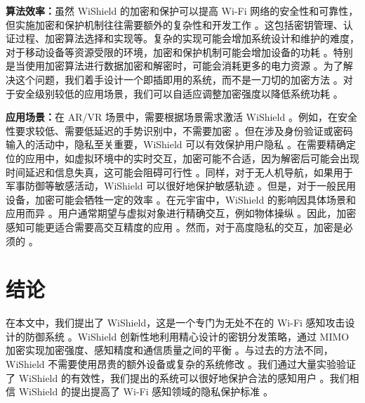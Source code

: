 \documentclass[journal]{IEEEtran}
\begin{document}
\textbf{算法效率：}虽然 WiShield 的加密和保护可以提高 Wi-Fi 网络的安全性和可靠性，但实施加密和保护机制往往需要额外的复杂性和开发工作 。这包括密钥管理、认证过程、加密算法选择和实现等。复杂的实现可能会增加系统设计和维护的难度，对于移动设备等资源受限的环境，加密和保护机制可能会增加设备的功耗 。特别是当使用加密算法进行数据加密和解密时，可能会消耗更多的电力资源 。为了解决这个问题，我们着手设计一个即插即用的系统，而不是一刀切的加密方法 。对于安全级别较低的应用场景，我们可以自适应调整加密强度以降低系统功耗 。

\textbf{应用场景：}在 AR/VR 场景中，需要根据场景需求激活 WiShield 。例如，在安全性要求较低、需要低延迟的手势识别中，不需要加密 。但在涉及身份验证或密码输入的活动中，隐私至关重要，WiShield 可以有效保护用户隐私 。在需要精确定位的应用中，如虚拟环境中的实时交互，加密可能不合适，因为解密后可能会出现时间延迟和信息失真，这可能会阻碍可行性 。同样，对于无人机导航，如果用于军事防御等敏感活动，WiShield 可以很好地保护敏感轨迹 。但是，对于一般民用设备，加密可能会牺牲一定的效率 。在元宇宙中，WiShield 的影响因具体场景和应用而异 。用户通常期望与虚拟对象进行精确交互，例如物体操纵 。因此，加密感知可能更适合需要高交互精度的应用 。然而，对于高度隐私的交互，加密是必须的 。

\section{结论}
在本文中，我们提出了 WiShield，这是一个专门为无处不在的 Wi-Fi 感知攻击设计的防御系统 。WiShield 创新性地利用精心设计的密钥分发策略，通过 MIMO 加密实现加密强度、感知精度和通信质量之间的平衡 。与过去的方法不同，WiShield 不需要使用昂贵的额外设备或复杂的系统修改 。我们通过大量实验验证了 WiShield 的有效性，我们提出的系统可以很好地保护合法的感知用户 。我们相信 WiShield 的提出提高了 Wi-Fi 感知领域的隐私保护标准 。
\end{document}
